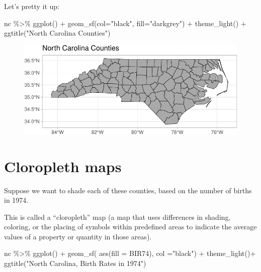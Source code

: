 \documentclass[
  letterpaper,
  DIV=11,
  numbers=noendperiod]{scrartcl}
\newenvironment{Shaded}{\begin{snugshade}}{\end{snugshade}}
\newcommand{\AttributeTok}[1]{\textcolor[rgb]{0.40,0.45,0.13}{#1}}
\newcommand{\FunctionTok}[1]{\textcolor[rgb]{0.28,0.35,0.67}{#1}}
\newcommand{\NormalTok}[1]{\textcolor[rgb]{0.00,0.23,0.31}{#1}}
\newcommand{\SpecialCharTok}[1]{\textcolor[rgb]{0.37,0.37,0.37}{#1}}
\newcommand{\StringTok}[1]{\textcolor[rgb]{0.13,0.47,0.30}{#1}}
\begin{document}
Let's pretty it up:

\begin{Shaded}
\begin{Highlighting}[]
\NormalTok{nc }\SpecialCharTok{\%\textgreater{}\%}
  \FunctionTok{ggplot}\NormalTok{() }\SpecialCharTok{+}
  \FunctionTok{geom\_sf}\NormalTok{(}\AttributeTok{col=}\StringTok{"black"}\NormalTok{, }\AttributeTok{fill=}\StringTok{"darkgrey"}\NormalTok{) }\SpecialCharTok{+}
  \FunctionTok{theme\_light}\NormalTok{() }\SpecialCharTok{+}
  \FunctionTok{ggtitle}\NormalTok{(}\StringTok{"North Carolina Counties"}\NormalTok{)}
\end{Highlighting}
\end{Shaded}

\begin{figure}[H]

{\centering \includegraphics{118_K_maps1_files/figure-pdf/unnamed-chunk-11-1.pdf}

}

\end{figure}

\hypertarget{cloropleth-maps}{%
\section{Cloropleth maps}\label{cloropleth-maps}}

Suppose we want to shade each of these counties, based on the number of
births in 1974.

This is called a ``cloropleth'' map (a map that uses differences in
shading, coloring, or the placing of symbols within predefined areas to
indicate the average values of a property or quantity in those areas).

\begin{Shaded}
\begin{Highlighting}[]
\NormalTok{nc }\SpecialCharTok{\%\textgreater{}\%}
  \FunctionTok{ggplot}\NormalTok{() }\SpecialCharTok{+}
  \FunctionTok{geom\_sf}\NormalTok{( }\FunctionTok{aes}\NormalTok{(}\AttributeTok{fill =}\NormalTok{ BIR74), }\AttributeTok{col =}\StringTok{"black"}\NormalTok{) }\SpecialCharTok{+}
  \FunctionTok{theme\_light}\NormalTok{()}\SpecialCharTok{+}
  \FunctionTok{ggtitle}\NormalTok{(}\StringTok{"North Carolina, Birth Rates in 1974"}\NormalTok{)}
\end{Highlighting}
\end{Shaded}
\end{document}
